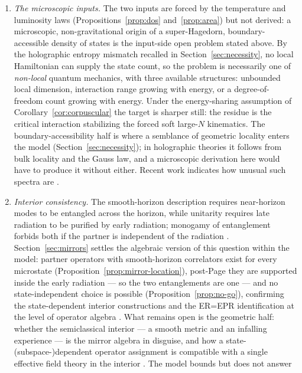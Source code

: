 \documentclass[12pt]{article}
\begin{document}
\begin{enumerate}
\item
\emph{The microscopic inputs.}  The two inputs are forced by the temperature
and luminosity laws (Propositions~\ref{prop:dos} and~\ref{prop:area}) but not
derived: a microscopic, non-gravitational origin of a super-Hagedorn,
boundary-accessible density of states is the input-side open problem stated
above.  By the holographic entropy mismatch recalled in
Section~\ref{sec:necessity}, no local Hamiltonian can supply the state
count, so the problem is necessarily one of \emph{non-local} quantum
mechanics, with three available structures: unbounded local dimension,
interaction range growing with energy, or a degree-of-freedom count growing
with energy.  Under the energy-sharing assumption of
Corollary~\ref{cor:corpuscular} the target is sharper still: the residue
is the critical interaction stabilizing the forced soft large-$N$
kinematics.  The boundary-accessibility half is where a semblance of
geometric locality enters the model (Section~\ref{sec:necessity}); in
holographic theories it follows from bulk locality and the Gauss law, and a
microscopic derivation here would have to produce it without either.
Recent work indicates how unusual such spectra are \cite{AurellMajumdar2025}.
\item
\emph{Interior consistency.}  The smooth-horizon description requires
near-horizon modes to be entangled across the horizon, while unitarity
requires late radiation to be purified by early radiation; monogamy of
entanglement forbids both if the partner is independent of the radiation
\cite{AMPS2013}.  Section~\ref{sec:mirrors} settles the algebraic version of
this question within the model: partner operators with smooth-horizon
correlators exist for every microstate
(Proposition~\ref{prop:mirror-location}), post-Page they are supported
inside the early radiation --- so the two entanglements are one --- and no
state-independent choice is possible
(Proposition~\ref{prop:no-go}), confirming the state-dependent
interior constructions and the ER=EPR identification at the level of
operator algebra \cite{PapadodimasRaju2013,PapadodimasRaju2014,
VerlindeVerlinde2013,MaldacenaSusskind2013}.  What remains open is the
geometric half: whether the semiclassical interior --- a smooth metric and an
infalling experience --- is the mirror algebra in disguise, and how a
state-(subspace-)dependent operator assignment is compatible with a single
effective field theory in the interior
\cite{AMPSS2013,MarolfPolchinski2016}.  The model bounds but does not answer

\end{enumerate}
\end{document}
